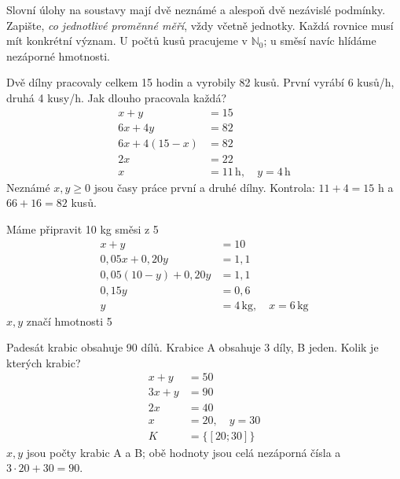 \documentclass[11pt,a4paper]{article}
\begin{document}
Slovní úlohy na soustavy mají dvě neznámé a alespoň dvě nezávislé podmínky. Zapište, \emph{co jednotlivé proměnné měří}, vždy včetně jednotky. Každá rovnice musí mít konkrétní význam. U počtů kusů pracujeme v $\mathbb N_0$; u směsí navíc hlídáme nezáporné hmotnosti.
\begin{prikladReseniBox}[title={Příklad 1}]
Dvě dílny pracovaly celkem 15 hodin a vyrobily 82 kusů. První vyrábí 6 kusů/h, druhá 4 kusy/h. Jak dlouho pracovala každá?
\tcblower
\[\begin{aligned}
x+y&=15 \\
6x+4y&=82 \\
6x+4(15-x)&=82 \\
2x&=22 \\
x&=11\,\mathrm h,\quad y=4\,\mathrm h
\end{aligned}\]
Neznámé $x,y\ge0$ jsou časy práce první a druhé dílny. Kontrola: $11+4=15$ h a $66+16=82$ kusů.
\end{prikladReseniBox}
\begin{prikladReseniBox}[title={Příklad 2}]
Máme připravit 10 kg směsi z 5%
\tcblower
\[\begin{aligned}
x+y&=10 \\
0{,}05x+0{,}20y&=1{,}1 \\
0{,}05(10-y)+0{,}20y&=1{,}1 \\
0{,}15y&=0{,}6 \\
y&=4\,\mathrm{kg},\quad x=6\,\mathrm{kg}
\end{aligned}\]
$x,y$ značí hmotnosti 5%
\end{prikladReseniBox}
\begin{zadaniReseniBox}[title={Samostatná práce 1}]
Padesát krabic obsahuje 90 dílů. Krabice A obsahuje 3 díly, B jeden. Kolik je kterých krabic?
\tcblower
\[\begin{aligned}
x+y&=50 \\
3x+y&=90 \\
2x&=40 \\
x&=20,\quad y=30 \\
K&=\{[20;30]\}
\end{aligned}\]
$x,y$ jsou počty krabic A a B; obě hodnoty jsou celá nezáporná čísla a $3\cdot20+30=90$.
\end{zadaniReseniBox}
\end{document}
